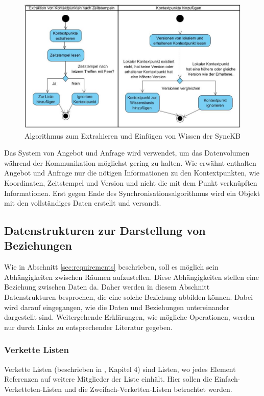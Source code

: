 \documentclass[a4paper]{article}
\begin{document}
	\begin{figure}[H] 
		\includegraphics[width=\linewidth]{../Bilder/sync_flow.jpg}
		\caption{Algorithmus zum Extrahieren und Einfügen von Wissen der SyncKB}
		\label{fig:SyncFlow}
	\end{figure}
	
	Das System von Angebot und Anfrage wird verwendet, um das Datenvolumen während
	der Kommunikation möglichst gering zu halten. Wie erwähnt enthalten Angebot
	und Anfrage nur die nötigen Informationen zu den Kontextpunkten, wie
	Koordinaten, Zeitstempel und Version und nicht die mit dem Punkt verknüpften
	Informationen. Erst gegen Ende des Synchronisationsalgorithmus wird ein 
	Objekt mit den vollständiges Daten erstellt und versandt.
	
	\subsection{Datenstrukturen zur Darstellung von Beziehungen}
	\label{sec:datastruct}
	
	Wie in Abschnitt \ref{sec:requirements} beschrieben, soll es möglich sein
	Abhängigkeiten zwischen Räumen aufzustellen. Diese Abhängigkeiten stellen
	eine Beziehung zwischen Daten da. Daher werden in diesem Abschnitt 
	Datenstrukturen besprochen, die eine solche Beziehung abbilden können.
	Dabei wird darauf eingegangen, wie die Daten und Beziehungen untereinander
	dargestellt sind. Weitergehende Erklärungen, wie mögliche Operationen, werden
	nur durch Links zu entsprechender Literatur gegeben.
	
	\subsubsection{Verkette Listen}
	
	Verkette Listen (beschrieben in \cite{FundData}, Kapitel 4) sind Listen,
	wo jedes Element Referenzen auf weitere Mitglieder der Liste einhält.
	Hier sollen die Einfach-Verketteten-Listen und die Zweifach-Verketten-Listen
	betrachtet werden.
	
\end{document}

